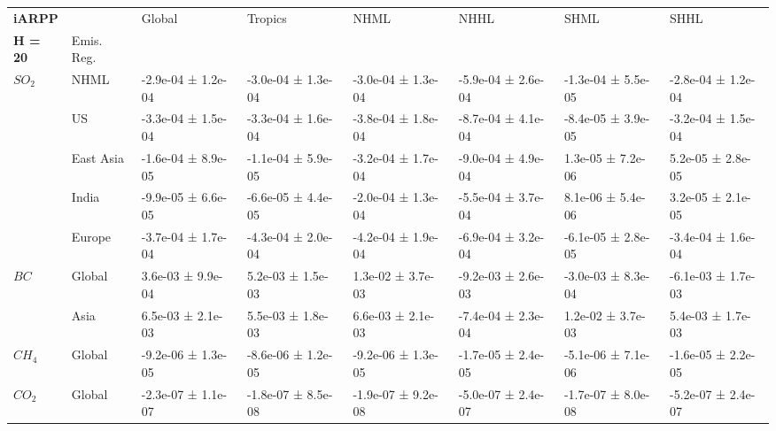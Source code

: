 \documentclass[preview]{standalone}
\newcommand{\nm}{\phantom{-}}
\begin{document}
	\tiny
	\begin{minipage}{\textwidth}
		\setlength\tabcolsep{5pt}
		\begin{tabular}{llllllll}
			\toprule
			\textbf{iARPP}       &        &               Global &              Tropics &                 NHML &                 NHHL &                 SHML &                 SHHL \\
			\textbf{H = 20} & Emis. Reg. &                      &                      &                      &                      &                      &                      \\
			\midrule
$SO_2$ & NHML &  -2.9e-04 ±  1.2e-04 &  -3.0e-04 ±  1.3e-04 &  -3.0e-04 ±  1.3e-04 &  -5.9e-04 ±  2.6e-04 &  -1.3e-04 ±  5.5e-05 &  -2.8e-04 ±  1.2e-04 \\
       & US &  -3.3e-04 ±  1.5e-04 &  -3.3e-04 ±  1.6e-04 &  -3.8e-04 ±  1.8e-04 &  -8.7e-04 ±  4.1e-04 &  -8.4e-05 ±  3.9e-05 &  -3.2e-04 ±  1.5e-04 \\
       & East Asia &  -1.6e-04 ±  8.9e-05 &  -1.1e-04 ±  5.9e-05 &  -3.2e-04 ±  1.7e-04 &  -9.0e-04 ±  4.9e-04 &   \nm1.3e-05 ±  7.2e-06 &   \nm5.2e-05 ±  2.8e-05 \\
       & India &  -9.9e-05 ±  6.6e-05 &  -6.6e-05 ±  4.4e-05 &  -2.0e-04 ±  1.3e-04 &  -5.5e-04 ±  3.7e-04 &   \nm8.1e-06 ±  5.4e-06 &   \nm3.2e-05 ±  2.1e-05 \\
       & Europe &  -3.7e-04 ±  1.7e-04 &  -4.3e-04 ±  2.0e-04 &  -4.2e-04 ±  1.9e-04 &  -6.9e-04 ±  3.2e-04 &  -6.1e-05 ±  2.8e-05 &  -3.4e-04 ±  1.6e-04 \\
\cmidrule(lr){1-8}
$BC$ & Global &   \nm3.6e-03 ±  9.9e-04 &   \nm5.2e-03 ±  1.5e-03 &   \nm1.3e-02 ±  3.7e-03 &  -9.2e-03 ±  2.6e-03 &  -3.0e-03 ±  8.3e-04 &  -6.1e-03 ±  1.7e-03 \\
       & Asia &   \nm6.5e-03 ±  2.1e-03 &   \nm5.5e-03 ±  1.8e-03 &   \nm6.6e-03 ±  2.1e-03 &  -7.4e-04 ±  2.3e-04 &   \nm1.2e-02 ±  3.7e-03 &   \nm5.4e-03 ±  1.7e-03 \\
\cmidrule(lr){1-8}
$CH_4$ & Global &  -9.2e-06 ±  1.3e-05 &  -8.6e-06 ±  1.2e-05 &  -9.2e-06 ±  1.3e-05 &  -1.7e-05 ±  2.4e-05 &  -5.1e-06 ±  7.1e-06 &  -1.6e-05 ±  2.2e-05 \\
\cmidrule(lr){1-8}
$CO_2$ & Global &  -2.3e-07 ±  1.1e-07 &  -1.8e-07 ±  8.5e-08 &  -1.9e-07 ±  9.2e-08 &  -5.0e-07 ±  2.4e-07 &  -1.7e-07 ±  8.0e-08 &  -5.2e-07 ±  2.4e-07 \\
\bottomrule
\end{tabular}

        \end{minipage}
        
\end{document}
